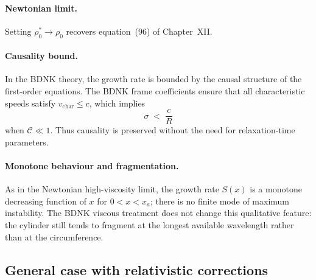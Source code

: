 \paragraph{Newtonian limit.}
Setting $\rho_{0}^{*}\to\rho_{0}$ recovers equation~(96) of
Chapter~XII.

\paragraph{Causality bound.}
In the BDNK theory, the growth rate is bounded by the causal structure
of the first-order equations.  The BDNK frame coefficients ensure that
all characteristic speeds satisfy $v_{\mathrm{char}} \leq c$, which
implies~\cite{BemficaDNK2023}
\begin{equation}
\label{eq:rel-12-35}
\sigma \;<\; \frac{c}{R}
\end{equation}
when $\mathcal{C}\ll 1$.  Thus causality is preserved without the need
for relaxation-time parameters.

\paragraph{Monotone behaviour and fragmentation.}
As in the Newtonian high-viscosity limit, the growth rate $S(x)$ is a
monotone decreasing function of $x$ for $0<x<x_{a}$; there is no
finite mode of maximum instability.  The BDNK viscous treatment does
not change this qualitative feature: the cylinder still tends to
fragment at the longest available wavelength rather than at the
circumference.

\subsection{General case with relativistic corrections}
\label{sec:rel-12-109d}


